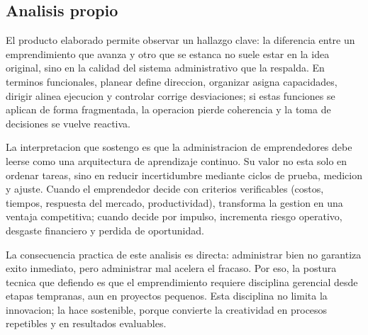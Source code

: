 \documentclass[
	spanish,
	letterpaper, oneside
]{article}
\begin{document}
%

\subsection{Analisis propio}

El producto elaborado permite observar un hallazgo clave: la diferencia entre un emprendimiento que avanza y otro que se estanca no suele estar en la idea original, sino en la calidad del sistema administrativo que la respalda. En terminos funcionales, planear define direccion, organizar asigna capacidades, dirigir alinea ejecucion y controlar corrige desviaciones; si estas funciones se aplican de forma fragmentada, la operacion pierde coherencia y la toma de decisiones se vuelve reactiva.

La interpretacion que sostengo es que la administracion de emprendedores debe leerse como una arquitectura de aprendizaje continuo. Su valor no esta solo en ordenar tareas, sino en reducir incertidumbre mediante ciclos de prueba, medicion y ajuste. Cuando el emprendedor decide con criterios verificables (costos, tiempos, respuesta del mercado, productividad), transforma la gestion en una ventaja competitiva; cuando decide por impulso, incrementa riesgo operativo, desgaste financiero y perdida de oportunidad.

La consecuencia practica de este analisis es directa: administrar bien no garantiza exito inmediato, pero administrar mal acelera el fracaso. Por eso, la postura tecnica que defiendo es que el emprendimiento requiere disciplina gerencial desde etapas tempranas, aun en proyectos pequenos. Esta disciplina no limita la innovacion; la hace sostenible, porque convierte la creatividad en procesos repetibles y en resultados evaluables.
\end{document}
